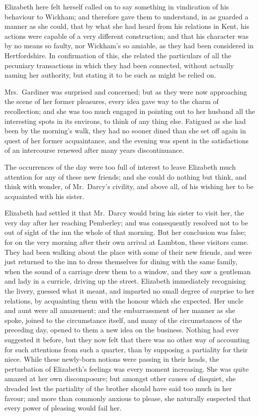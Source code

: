 Elizabeth here felt herself called on to say something
in vindication of his behaviour to Wickham; and therefore
gave them to understand, in as guarded a manner
as she could, that by what she had heard from his relations
in Kent, his actions were capable of a very different
construction; and that his character was by no means
so faulty, nor Wickham’s so amiable, as they had been
considered in Hertfordshire. In confirmation of this, she
related the particulars of all the pecuniary transactions
in which they had been connected, without actually
naming her authority, but stating it to be such as might
be relied on.

Mrs.\ Gardiner was surprised and concerned; but as they
were now approaching the scene of her former pleasures,
every idea gave way to the charm of recollection; and
she was too much engaged in pointing out to her husband
all the interesting spots in its environs, to think of any
thing else. Fatigued as she had been by the morning’s
walk, they had no sooner dined than she set off again in
quest of her former acquaintance, and the evening was
spent in the satisfactions of an intercourse renewed after
many years discontinuance.

The occurrences of the day were too full of interest to
leave Elizabeth much attention for any of these new
friends; and she could do nothing but think, and think
with wonder, of Mr.\ Darcy’s civility, and above all, of his
wishing her to be acquainted with his sister.


Elizabeth had settled it that Mr.\ Darcy would bring
his sister to visit her, the very day after her reaching
Pemberley; and was consequently resolved not to be out
of sight of the inn the whole of that morning. But her
conclusion was false; for on the very morning after their
own arrival at Lambton, these visitors came. They had
been walking about the place with some of their new
friends, and were just returned to the inn to dress themselves
for dining with the same family, when the sound
of a carriage drew them to a window, and they saw
a gentleman and lady in a curricle, driving up the street.
Elizabeth immediately recognising the livery, guessed
what it meant, and imparted no small degree of surprise
to her relations, by acquainting them with the honour
which she expected. Her uncle and aunt were all amazement;
and the embarrassment of her manner as she
spoke, joined to the circumstance itself, and many of the
circumstances of the preceding day, opened to them a new
idea on the business. Nothing had ever suggested it
before, but they now felt that there was no other way of
accounting for such attentions from such a quarter, than
by supposing a partiality for their niece. While these
newly-born notions were passing in their heads, the perturbation
of Elizabeth’s feelings was every moment
increasing. She was quite amazed at her own discomposure;
but amongst other causes of disquiet, she dreaded
lest the partiality of the brother should have said too
much in her favour; and more than commonly anxious
to please, she naturally suspected that every power of
pleasing would fail her.

